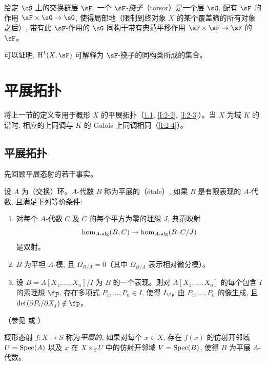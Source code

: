 \subsubsection{}\label{I:1-6-6}

给定 $\cS$ 上的交换群层 $\sF$, 一个 \emph{$\sF$-挠子}（torsor）是一个层 $\sG$, 配有 $\sF$ 的作用 $\sF\times\sG\to\sG$, 使得局部地（限制到终对象 $X$ 的某个覆盖筛的所有对象之后）, 带有此 $\sF$-作用的 $\sG$ 同构于带有典范平移作用 $\sF\times\sF\to\sF$ 的 $\sF$。

可以证明, $\h^1(X,\sF)$ 可解释为 $\sF$-挠子的同构类所成的集合。

\section{平展拓扑}\label{I:2}

将上一节的定义专用于概形 $X$ 的平展拓扑（\ref{I:2-1}, \ref{I:2-2}, \ref{I:2-3}）。当 $X$ 为域 $K$ 的谱时, 相应的上同调与 $K$ 的 Galois 上同调相同（\ref{I:2-4}）。

\subsection{平展拓扑}\label{I:2-1}

先回顾平展态射的若干事实。

\begin{definition}\label{I:2-1-1}
设 $A$ 为（交换）环。$A$-代数 $B$ 称为平展的（étale）, 如果 $B$ 是有限表现的 $A$-代数, 且满足下列等价条件:
\begin{enumerate}[\indent a)]
  \item 对每个 $A$-代数 $C$ 及 $C$ 的每个平方为零的理想 $J$, 典范映射
    \[
      \hom_{A\textnormal{-alg}}(B,C) \to \hom_{A\textnormal{-alg}}(B,C/J)
    \]
    是双射。
  \item $B$ 为平坦 $A$-模, 且 $\Omega_{B/A}=0$（其中 $\Omega_{B/A}$ 表示相对微分模）。
  \item 设 $B=A[X_1,\dotsc,X_n]/I$ 为 $B$ 的一个表现。则对 $A[X_1,\dotsc,X_n]$ 的每个包含 $I$ 的素理想 $\fp$, 存在多项式 $P_1,\dotsc,P_n\in I$, 使得 $I_\fp$ 由 $P_1,\dotsc,P_n$ 的像生成, 且 $\det(\partial P_i/\partial X_j)\notin\fp$。
\end{enumerate}
\end{definition}
（参见 \cite[I]{sga1} 或 \cite[V]{ra70}）

概形态射 $f:X\to S$ 称为\emph{平展的}, 如果对每个 $x\in X$, 存在 $f(x)$ 的仿射开邻域 $U=\operatorname{Spec}(A)$ 以及 $x$ 在 $X\times_SU$ 中的仿射开邻域 $V=\operatorname{Spec}(B)$, 使得 $B$ 为平展 $A$-代数。

